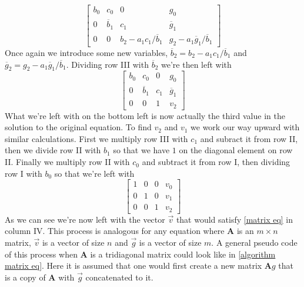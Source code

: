 \documentclass[english,notitlepage]{revtex4-1}  %
\begin{document}
\begin{equation}
    \begin{bmatrix}
        b_0 & c_0 & 0 & g_0 \\
        0 & \overline{b}_1 & c_1 & \overline{g}_1 \\
        0 & 0 & b_2 - a_1c_1/\overline{b}_1 & g_2 - a_1\overline{g}_1/\overline{b}_1
    \end{bmatrix}
\end{equation}
Once again we introduce some new variables, $\overline{b}_2 = b_2 - a_1c_1/\overline{b}_1$ and $\overline{g}_2 = g_2 - a_1\overline{g}_1/\overline{b}_1$. Dividing row III with $\overline{b}_2$ we're then left with
\begin{equation}
    \begin{bmatrix}
        b_0 & c_0 & 0 & g_0 \\
        0 & \overline{b}_1 & c_1 & \overline{g}_1 \\
        0 & 0 & 1 & v_2
    \end{bmatrix}
\end{equation}
What we're left with on the bottom left is now actually the third value in the solution to the original equation. To find $v_2$ and $v_1$ we work our way upward with similar calculations. First we multiply row III with $c_1$ and subract it from row II, then we divide row II with $b_1$ so that we have $1$ on the diagonal element on row II. Finally we multiply row II with $c_0$ and subtract it from row I, then dividing row I with $b_0$ so that we're left with
\begin{equation}
    \begin{bmatrix}
        1 & 0 & 0 & v_0 \\
        0 & 1 & 0 & v_1 \\
        0 & 0 & 1 & v_2
    \end{bmatrix}
\end{equation}
As we can see we're now left with the vector $\vec{v}$ that would satisfy \cref{matrix eq} in column IV. This process is analogous for any equation where $\textbf{A}$ is an $m \times n$ matrix, $\vec{v}$ is a vector of size $n$ and $\vec{g}$ is a vector of size $m$. A general pseudo code of this process when $\textbf{A}$ is a tridiagonal matrix could look like in \cref{algorithm matrix eq}. Here it is assumed that one would first create a new matrix $\textbf{A}g$ that is a copy of $\textbf{A}$ with $\vec{g}$ concatenated to it.
\end{document}
